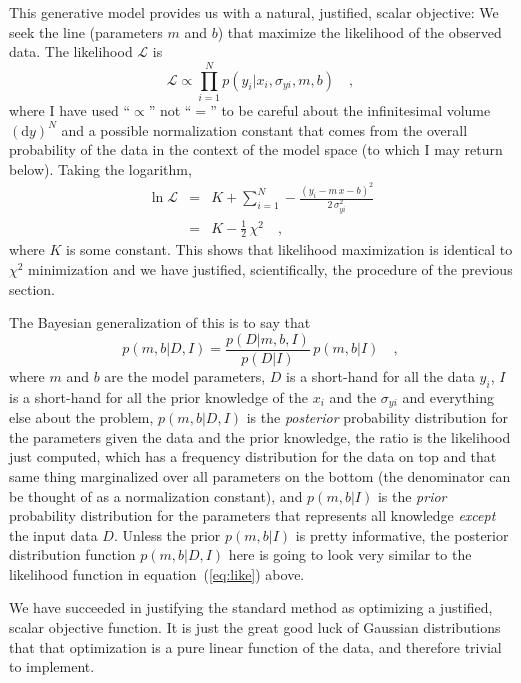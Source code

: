 \documentclass[12pt]{article}
\renewcommand{\d}{\mathrm{d}}
\newcommand{\like}{\mathscr{L}}
\begin{document}
This generative model provides us with a natural, justified, scalar objective:  We seek the line (parameters $m$ and $b$) that maximize the likelihood of the observed data.  The likelihood $\like$ is 
\begin{equation}\label{eq:like}
\like \propto \prod_{i=1}^N p(y_i|x_i,\sigma_{yi},m,b) \quad ,
\end{equation}
where I have used ``$\propto$'' not ``$=$'' to be careful about the
infinitesimal volume $(\d y)^N$ and a possible normalization constant
that comes from the overall probability of the data in the context of
the model space (to which I may return below).  Taking the logarithm,
\begin{eqnarray}\displaystyle
\ln\like
 & = & K + \sum_{i=1}^N -\frac{(y_i - m\,x - b)^2}{2\,\sigma_{yi}^2} \nonumber\\
 & = & K - \frac{1}{2}\,\chi^2 \quad ,
\end{eqnarray}
where $K$ is some constant.  This shows that likelihood maximization
is identical to $\chi^2$ minimization and we have justified,
scientifically, the procedure of the previous section.

The Bayesian generalization of this is to say that
\begin{equation}
p(m,b|D,I) = \frac{p(D|m,b,I)}{p(D|I)}\,p(m,b|I) \quad ,
\end{equation}
where $m$ and $b$ are the model parameters, $D$ is a short-hand for
all the data $y_i$, $I$ is a short-hand for all the prior knowledge of
the $x_i$ and the $\sigma_{yi}$ and everything else about the problem,
$p(m,b|D,I)$ is the \emph{posterior} probability distribution for the
parameters given the data and the prior knowledge, the ratio is the
likelihood just computed, which has a frequency distribution for the
data on top and that same thing marginalized over all parameters on
the bottom (the denominator can be thought of as a normalization
constant), and $p(m,b|I)$ is the \emph{prior} probability distribution
for the parameters that represents all knowledge \emph{except} the
input data $D$.  Unless the prior $p(m,b|I)$ is pretty informative,
the posterior distribution function $p(m,b|D,I)$ here is going to look
very similar to the likelihood function in equation~(\ref{eq:like})
above.

We have succeeded in justifying the standard method as optimizing a
justified, scalar objective function.  It is just the great good luck
of Gaussian distributions that that optimization is a pure linear
function of the data, and therefore trivial to implement.
\end{document}
